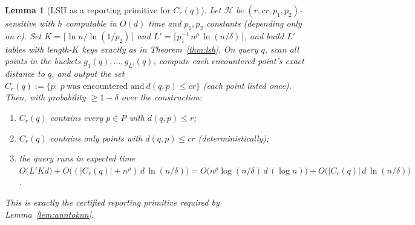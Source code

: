 \documentclass{amsart}
\newtheorem{lemma}{Lemma}
\begin{document}
\begin{lemma}[LSH as a reporting primitive for $C_r(q)$]\label{lem:lshreport}
Let $\mathcal H$ be $(r,cr,p_1,p_2)$-sensitive with $h$ computable in $O(d)$ time and
$p_1,p_2$ constants (depending only on $c$).  Set $K=\lceil\ln n/\ln(1/p_2)\rceil$ and
$L'=\big\lceil p_1^{-1}\,n^{\rho}\,\ln(n/\delta)\big\rceil$, and build $L'$ tables with
length-$K$ keys exactly as in Theorem~\ref{thm:lsh}.  On query $q$, scan
\emph{all} points in the buckets $g_1(q),\dots,g_{L'}(q)$, compute each encountered
point's exact distance to $q$, and output the set
$C_r(q):=\{p:\ p\ \text{was encountered and}\ d(q,p)\le cr\}$ (each point listed once).
Then, with probability $\ge 1-\delta$ over the construction:
\begin{enumerate}
\item[(i)] $C_r(q)$ contains \emph{every} $p\in P$ with $d(q,p)\le r$;
\item[(ii)] $C_r(q)$ contains \emph{only} points with $d(q,p)\le cr$ (deterministically);
\item[(iii)] the query runs in expected time $O\big(L'Kd\big)+O\big((|C_r(q)|+n^{\rho})\,d\,\ln(n/\delta)\big)
=O\big(n^{\rho}\log(n/\delta)\,d\,(\log n)\big)+O\big(|C_r(q)|\,d\,\ln(n/\delta)\big)$.
\end{enumerate}
This is exactly the certified reporting primitive required by
Lemma~\ref{lem:anntoknn}.
\end{lemma}
\end{document}
